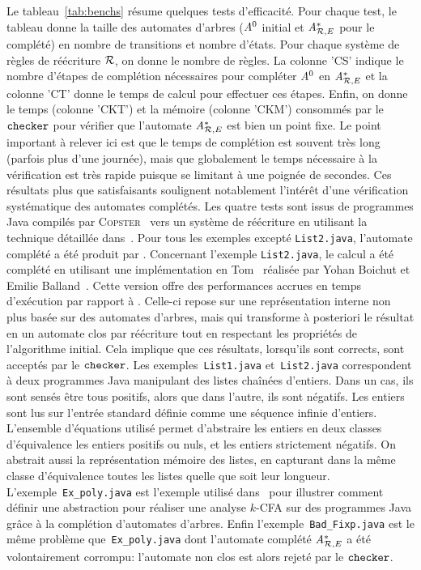 Le tableau~\ref{tab:benchs} résume quelques tests
d'efficacité. Pour chaque test, le tableau donne la taille des automates d'arbres 
($\mathit A^0$ initial et ${\mathit A}_{\mathcal R,E}^*$ pour le complété) en nombre de transitions et nombre d'états.
Pour chaque système de règles de réécriture $\mathcal R$, on donne le nombre de règles.
La colonne 'CS' indique le nombre d'étapes de complétion nécessaires pour compléter
$\mathit A^0$ en ${\mathit A}_{\mathcal R,E}^*$ et la colonne 'CT' donne le temps de calcul pour effectuer ces étapes.
Enfin, on donne le temps (colonne 'CKT') et la mémoire (colonne 'CKM') consommés par le $\mathtt{checker}$
pour vérifier que l'automate ${\mathit A}_{\mathcal R,E}^*$ est bien un point fixe.
Le point important à relever ici est que le temps de complétion est souvent très long 
(parfois plus d'une journée), mais que globalement le temps nécessaire à la vérification
est très rapide puisque se limitant à une poignée de secondes. Ces résultats plus que
satisfaisants soulignent notablement l'intérêt d'une vérification systématique des automates
complétés.
Les quatre tests sont issus de programmes Java compilés par \textsc{Copster}~\cite{Copster}
vers un système de réécriture en utilisant la technique détaillée dans~\cite{BoichutGJL-RTA07}.
Pour tous les exemples excepté \texttt{List2.java}, l'automate complété a été produit par \timbuk.
Concernant l'exemple \texttt{List2.java}, le calcul a été complété en utilisant 
une implémentation en Tom~\cite{TOM} réalisée par Yohan Boichut et Emilie Balland~\cite{BallandBGM-AMAST08}.
Cette version offre des performances accrues en temps d'exécution par rapport à \timbuk. Celle-ci repose
sur une représentation interne non plus basée sur des automates d'arbres, mais qui transforme 
à posteriori le résultat en un automate clos par réécriture tout en respectant les propriétés de l'algorithme
initial. Cela implique que ces résultats, lorsqu'ils sont corrects, sont acceptés par le $\mathtt{checker}$.
Les exemples~\texttt{List1.java} et~\texttt{List2.java} correspondent à deux programmes Java 
manipulant des listes chaînées d'entiers. Dans un cas, ils sont sensés être tous positifs,
alors que dans l'autre, ils sont négatifs. Les entiers sont lus sur l'entrée standard définie
comme une séquence infinie d'entiers. L'ensemble d'équations utilisé permet d'abstraire les entiers 
en deux classes d'équivalence les entiers positifs ou nuls, et les entiers strictement négatifs. On abstrait aussi
la représentation mémoire des listes, en capturant dans la même classe d'équivalence toutes les listes quelle que 
soit leur longueur.
L'exemple~\texttt{Ex\_poly.java} est l'exemple utilisé dans~\cite{BoichutGJL-RTA07} 
pour illustrer comment définir une abstraction pour réaliser 
une analyse $k$-CFA sur des programmes Java grâce à la complétion d'automates d'arbres.
Enfin l'exemple~\texttt{Bad\_Fixp.java} est le même problème que~\texttt{Ex\_poly.java} dont l'automate
complété ${\mathit A}_{\mathcal R,E}^*$ a été volontairement corrompu: l'automate non clos est alors rejeté
par le $\mathtt{checker}$.

